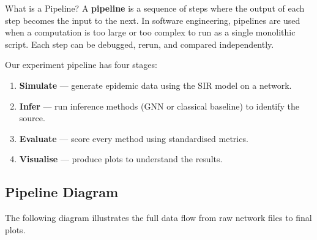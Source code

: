 \begin{conceptbox}{What is a Pipeline?}
A \textbf{pipeline} is a sequence of steps where the output of each step becomes the input to the next. In software engineering, pipelines are used when a computation is too large or too complex to run as a single monolithic script. Each step can be debugged, rerun, and compared independently.

Our experiment pipeline has four stages:
\begin{enumerate}
    \item \textbf{Simulate} --- generate epidemic data using the SIR model on a network.
    \item \textbf{Infer} --- run inference methods (GNN or classical baseline) to identify the source.
    \item \textbf{Evaluate} --- score every method using standardised metrics.
    \item \textbf{Visualise} --- produce plots to understand the results.
\end{enumerate}
\end{conceptbox}

\subsection{Pipeline Diagram}

The following diagram illustrates the full data flow from raw network files to final plots.

